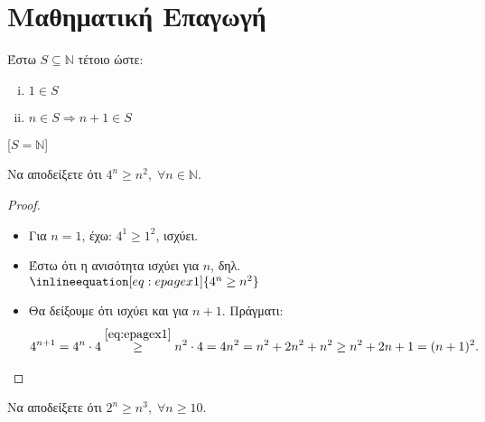 \documentclass[main.tex]{subfiles}
\begin{document}
\section{Μαθηματική Επαγωγή}

\begin{thm}
    Έστω $ S \subseteq \mathbb{N} $ τέτοιο ώστε:
    \begin{minipage}[t]{0.25\textwidth}
        \begin{enumerate}[i)]
            \item  $ 1 \in S $ \hfill {}
            \item  $ n \in S \Rightarrow n + 1 \in S $ \hfill {}
        \end{enumerate} 
    \end{minipage}
    [$ S = \mathbb{N} $]

\end{thm}

\begin{example}
    Να αποδείξετε ότι $ 4^{n} \geq n^{2}, \; \forall n \in \mathbb{N} $.
\end{example}


\begin{proof}
\item {}
    \begin{itemize}
        \item Για $ n=1 $, έχω: $ 4^{1} \geq 1^{2} $, ισχύει.
        \item Έστω ότι η ανισότητα ισχύει για $n$, δηλ. 
            $\inlineequation[eq:epagex1]{4^{n} \geq n^{2}}$
        \item Θα δείξουμε ότι ισχύει και για $ n+1 $. Πράγματι:
            \begin{align*}
                4^{n+1} = 4^{n}\cdot 4 \overset{\eqref{eq:epagex1}}{\geq}
                n^{2}\cdot 4 
                = 4n^{2} = n^{2} + 2n^{2} + n^{2} \geq n^{2} + 2n + 1 = (n+1)^{2}.
            \end{align*}
    \end{itemize}
\end{proof}

\begin{example}
    Να αποδείξετε ότι $ 2^{n} \geq n^{3}, \; \forall n \geq 10 $.
\end{example}
\end{document}
